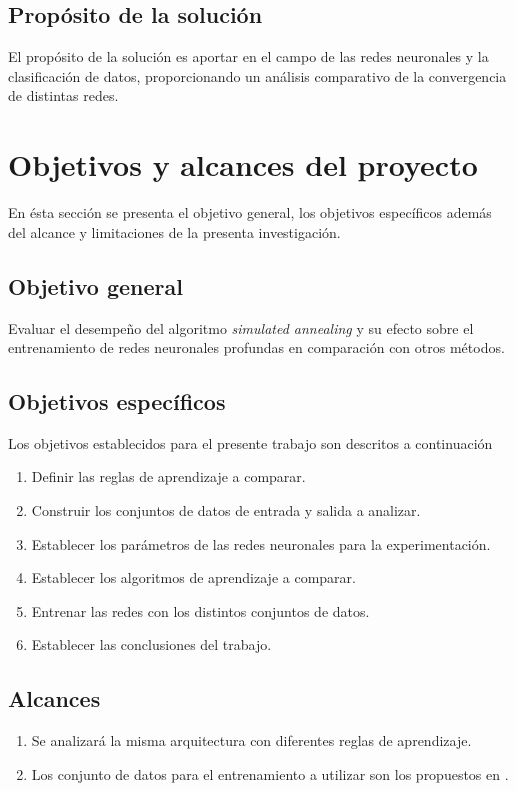 \subsection{Propósito de la solución}
El propósito de la solución es aportar en el campo de las redes neuronales y la clasificación de datos, proporcionando un análisis comparativo de la convergencia de distintas redes.

\section{Objetivos y alcances del proyecto}
En ésta sección se presenta el objetivo general, los objetivos específicos además del alcance y limitaciones de la presenta investigación.

\subsection{Objetivo general}
Evaluar el desempeño del algoritmo {\em simulated annealing} y su efecto sobre el entrenamiento de redes neuronales profundas en comparación con otros métodos.

\subsection{Objetivos específicos}
Los objetivos establecidos para el presente trabajo son descritos a continuación
\begin{enumerate}
	\item Definir las reglas de aprendizaje a comparar.
	\item Construir los conjuntos de datos de entrada y salida a analizar.
	\item Establecer los parámetros de las redes neuronales para la experimentación.
	\item Establecer los algoritmos de aprendizaje a comparar.
	\item Entrenar las redes con los distintos conjuntos de datos.
	\item Establecer las conclusiones del trabajo.
\end{enumerate}

\subsection{Alcances}
\begin{enumerate}
	\item Se analizará la misma arquitectura con diferentes reglas de aprendizaje.
	\item Los conjunto de datos para el entrenamiento a utilizar son los propuestos en \cite{Morse2016}.
\end{enumerate}

